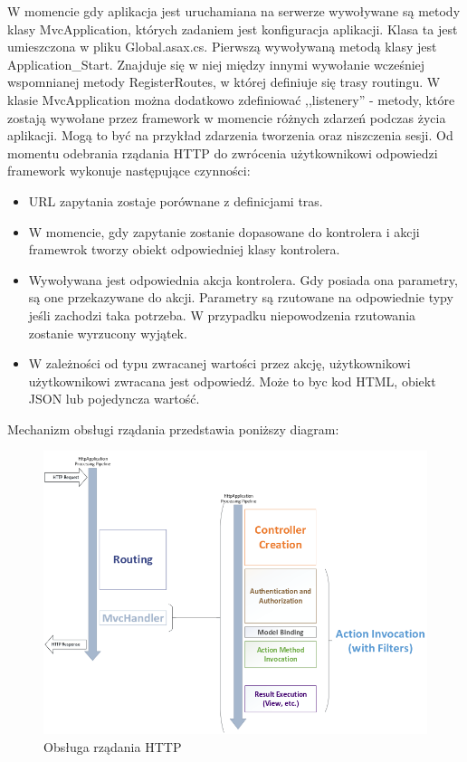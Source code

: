 W momencie gdy aplikacja jest uruchamiana na serwerze wywoływane są metody klasy MvcApplication, których zadaniem jest konfiguracja aplikacji. Klasa ta jest umieszczona w pliku Global.asax.cs. Pierwszą wywoływaną metodą klasy jest Application\_Start. Znajduje się w niej między innymi wywołanie wcześniej wspomnianej metody RegisterRoutes, w której definiuje się trasy routingu. W klasie MvcApplication można dodatkowo zdefiniować ,,listenery'' - metody, które zostają wywołane przez framework w momencie różnych zdarzeń podczas życia aplikacji. Mogą to być na przykład zdarzenia tworzenia oraz niszczenia sesji.
Od momentu odebrania rządania HTTP do zwrócenia użytkownikowi odpowiedzi framework wykonuje następujące czynności:
\begin{itemize}
\item URL zapytania zostaje porównane z definicjami tras.
\item W momencie, gdy zapytanie zostanie dopasowane do kontrolera i akcji framewrok tworzy obiekt odpowiedniej klasy kontrolera. 
\item Wywoływana jest odpowiednia akcja kontrolera. Gdy posiada ona parametry, są one przekazywane do akcji. Parametry są rzutowane na odpowiednie typy jeśli zachodzi taka potrzeba. W przypadku niepowodzenia rzutowania zostanie wyrzucony wyjątek.
\item W zależności od typu zwracanej wartości przez akcję, użytkownikowi użytkownikowi zwracana jest odpowiedź. Może to byc kod HTML, obiekt JSON lub pojedyncza wartość.
\end{itemize}


Mechanizm obsługi rządania przedstawia poniższy diagram:

\begin{figure}[b]
	\includegraphics[width=140mm]{./img/mvc-diagram.png}
	\caption{Obsługa rządania HTTP}
	\label{fig:mvc-diagram}
\end{figure}




